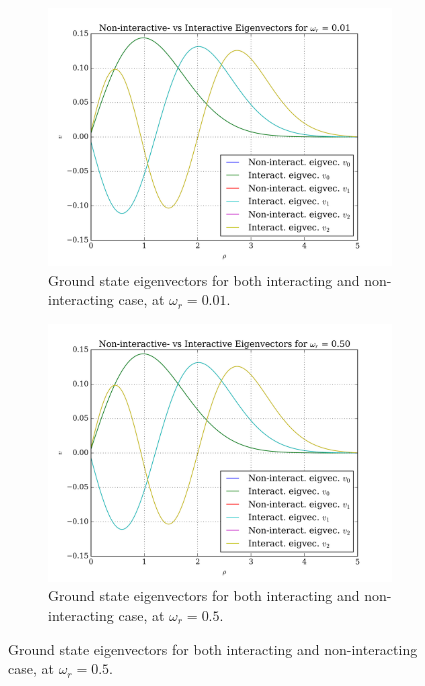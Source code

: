 \documentclass[11pt,a4paper,notitlepage]{article}
\begin{document}
 \begin{figure}[H]
 \center
 	\begin{subfigure}[t]{0.45\textwidth}
 		\includegraphics[scale=0.40]{../interacting_eigvecs_at_omega=10.png}
 		\caption{Ground state eigenvectors for both interacting and non-interacting case, at $\omega_r = 0.01$.}\label{fig:eigvecs-interact10}
 	\end{subfigure}
 	\hfill
 	\begin{subfigure}[t]{0.45\textwidth}
 		\includegraphics[scale=0.40]{../interacting_eigvecs_at_omega=500.png}
 		\caption{Ground state eigenvectors for both interacting and non-interacting case, at $\omega_r = 0.5$.}\label{fig:eigvecs-interact500}
 	\end{subfigure}

\end{figure}
\end{document}
